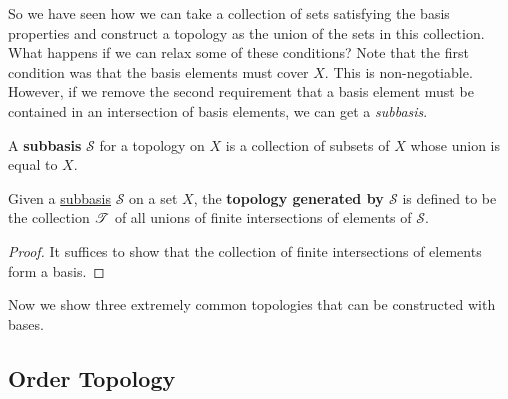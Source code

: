   So we have seen how we can take a collection of sets satisfying the basis properties and construct a topology as the union of the sets in this collection. What happens if we can relax some of these conditions? Note that the first condition was that the basis elements must cover $X$. This is non-negotiable. However, if we remove the second requirement that a basis element must be contained in an intersection of basis elements, we can get a \textit{subbasis}. 

  \begin{definition}[Subbasis]
    \label{def:subbasis}
    A \textbf{subbasis} $\mathscr{S}$ for a topology on $X$ is a collection of subsets of $X$ whose union is equal to $X$. 
  \end{definition}

  \begin{theorem}
    \label{thm:subbasis-to-topology}
    Given a \hyperref[def:subbasis]{subbasis} $\mathscr{S}$ on a set $X$, the \textbf{topology generated by $\mathscr{S}$} is defined to be the collection $\operatorname{\mathscr{T}}$ of all unions of finite intersections of elements of $\mathscr{S}$. 
  \end{theorem}
  \begin{proof}
    It suffices to show that the collection of finite intersections of elements form a basis. 
  \end{proof}

  Now we show three extremely common topologies that can be constructed with bases. 

\subsection{Order Topology}

